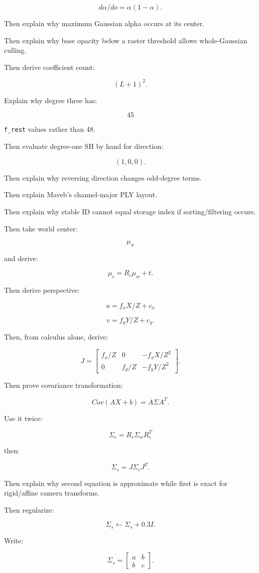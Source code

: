 \[
d\alpha/do
=
\alpha(1-\alpha).
\]

Then explain why maximum Gaussian alpha occurs at its center.

Then explain why base opacity below a raster threshold allows whole-Gaussian culling.

Then derive coefficient count:

\[
(L+1)^2.
\]

Explain why degree three has:

\[
45
\]

\texttt{f\_rest} values rather than 48.

Then evaluate degree-one SH by hand for direction:

\[
(1,0,0).
\]

Then explain why reversing direction changes odd-degree terms.

Then explain Maveb's channel-major PLY layout.

Then explain why stable ID cannot equal storage index if sorting/filtering occurs.

Then take world center:

\[
\mu_w
\]

and derive:

\[
\mu_c=R_c\mu_w+t.
\]

Then derive perspective:

\[
u=f_xX/Z+c_x
\]

\[
v=f_yY/Z+c_y.
\]

Then, from calculus alone, derive:

\[
J=
\begin{bmatrix}
f_x/Z&0&-f_xX/Z^2\\
0&f_y/Z&-f_yY/Z^2
\end{bmatrix}.
\]

Then prove covariance transformation:

\[
Cov(AX+b)=A\Sigma A^T.
\]

Use it twice:

\[
\Sigma_c=
R_c\Sigma_wR_c^T
\]

then:

\[
\Sigma_s=
J\Sigma_cJ^T.
\]

Then explain why second equation is approximate while first is exact for rigid/affine camera transforms.

Then regularize:

\[
\Sigma_s\leftarrow
\Sigma_s+0.3I.
\]

Write:

\[
\Sigma_s=
\begin{bmatrix}
a&b\\
b&c
\end{bmatrix}.
\]

